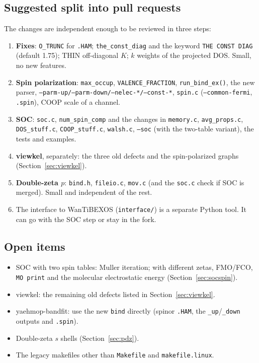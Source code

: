 \documentclass[11pt,a4paper]{article}
\newcommand{\file}[1]{\texttt{#1}}
\newcommand{\fn}[1]{\texttt{#1()}}
\newcommand{\var}[1]{\texttt{#1}}
\newcommand{\opt}[1]{\texttt{#1}}
\begin{document}
\subsection{Suggested split into pull requests}
The changes are independent enough to be reviewed in three steps:
\begin{enumerate}
\item \textbf{Fixes}: \texttt{O\_TRUNC} for \texttt{.HAM}; \var{the\_const\_diag} and
  the keyword \texttt{THE CONST DIAG} (default 1.75); THIN off-diagonal $K$; $k$ weights
  of the projected DOS. Small, no new features.
\item \textbf{Spin polarization}: \var{max\_occup}, \var{VALENCE\_FRACTION},
  \fn{run\_bind\_ex}, the new parser, \opt{--parm-up/--parm-down/--nelec-*/--const-*},
  \file{spin.c} (\opt{--common-fermi}, \texttt{.spin}), COOP scale of a channel.
\item \textbf{SOC}: \file{soc.c}, \var{num\_spin\_comp} and the changes in
  \file{memory.c}, \file{avg\_props.c}, \file{DOS\_stuff.c}, \file{COOP\_stuff.c},
  \file{walsh.c}, \opt{--soc} (with the two-table variant), the tests and examples.
\item \textbf{viewkel}, separately: the three old defects and the spin-polarized graphs
  (Section~\ref{sec:viewkel}).
\item \textbf{Double-zeta $p$}: \file{bind.h}, \file{fileio.c}, \file{mov.c} (and the
  \file{soc.c} check if SOC is merged). Small and independent of the rest.
\item The interface to WanTiBEXOS (\file{interface/}) is a separate Python tool. It can go
  with the SOC step or stay in the fork.
\end{enumerate}

\subsection{Open items}\label{sec:todo}
\begin{itemize}
\item SOC with two spin tables: Muller iteration; with different zetas, FMO/FCO,
  \texttt{MO print} and the molecular electrostatic energy (Section~\ref{sec:socspin}).
\item viewkel: the remaining old defects listed in Section~\ref{sec:viewkel}.
\item yaehmop-bandfit: use the new \texttt{bind} directly (spinor \texttt{.HAM}, the
  \texttt{\_up}/\texttt{\_down} outputs and \texttt{.spin}).
\item Double-zeta $s$ shells (Section~\ref{sec:pdz}).
\item The legacy makefiles other than \file{Makefile} and \file{makefile.linux}.
\end{itemize}
\end{document}
